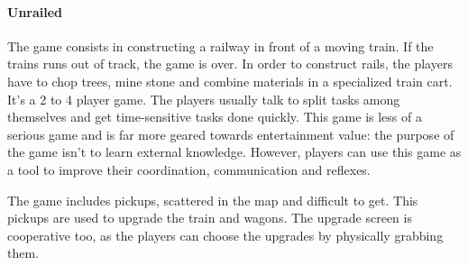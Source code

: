 \documentclass[12pt]{article}
\begin{document}
\clearpage

\paragraph{Unrailed} \cite{unrailed}
The game consists in constructing a railway in front of a moving train. If the trains runs out of track, the game is over. In order to construct rails, the players have to chop trees, mine stone and combine materials in a specialized train cart. It's a 2 to 4 player game. The players  usually talk to split tasks among themselves and get time-sensitive tasks done quickly. This game is less of a serious game and is far more geared towards entertainment value: the purpose of the game isn't to learn external knowledge. However, players can use this game as a tool to improve their coordination, communication and reflexes.

\vspace{0.4cm}

\vspace{0.4cm}
The game includes pickups, scattered in the map and difficult to get. This pickups are used to upgrade the train and wagons. The upgrade screen is cooperative too, as the players can choose the upgrades by physically grabbing them.

\vfill
{}
\end{document}
